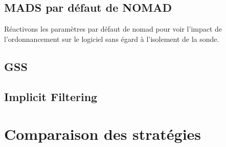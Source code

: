 \documentclass[letterpaper]{scrartcl}
\begin{document}
	\subsection{MADS par défaut de NOMAD}
	Réactivons les paramètres par défaut de nomad pour voir l'impact de l'ordonnancement sur le logiciel sans égard à l'isolement de la sonde.
	\subsection{GSS}
	\subsection{Implicit Filtering}
	\clearpage
\section{Comparaison des stratégies}
\end{document}
